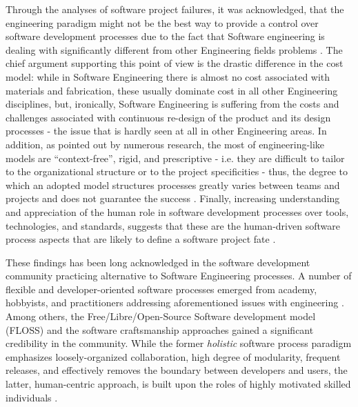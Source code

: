 Through the analyses of software project failures, it was acknowledged, that the engineering 
paradigm might not be the best way to provide a control over software development processes 
due to the fact that Software engineering is dealing with significantly different from other Engineering 
fields problems \cite{citeulike:3729379} \cite{citeulike:5203446} \cite{citeulike:2207657} .
The chief argument supporting this point of view is the drastic difference in the cost model:
while in Software Engineering there is almost no cost associated with materials and 
fabrication, these usually dominate cost in all other Engineering disciplines, but, 
ironically, Software Engineering is suffering from the costs and challenges associated with 
continuous re-design of the product and its design processes - the issue that is 
hardly seen at all in other Engineering areas. 
In addition, as pointed out by numerous research,  the most of engineering-like models are 
``context-free'', rigid, and prescriptive - i.e. they are difficult to tailor to the organizational 
structure or to the project specificities  - thus, the degree to which an adopted model structures 
processes greatly varies between teams and projects and does not guarantee the 
success \cite{sacchi_2001}.
Finally, increasing understanding and appreciation of the human role in software development 
processes over tools, technologies, and standards, suggests that these are the human-driven 
software process aspects that are likely to define a software project fate 
\cite{citeulike:6580825} \cite{citeulike:149387} \cite{1605185}
 \cite{citeulike:113403} \cite{citeulike:12743107}. 

These findings has been long acknowledged in the software development community practicing 
alternative to Software Engineering processes. 
A number of flexible and developer-oriented software processes emerged from academy,
hobbyists, and practitioners addressing aforementioned issues with engineering \cite{citeulike:3729379}. 
Among others, the Free/Libre/Open-Source Software development model (FLOSS) and the 
software craftsmanship  approaches gained a significant credibility in the community. 
While the former \textit{holistic} software process paradigm emphasizes loosely-organized 
collaboration, high degree of modularity, frequent releases, and effectively removes the boundary 
between developers and users, the latter, human-centric approach, is built upon the roles of highly 
motivated skilled individuals \cite{citeulike:262020} \cite{citeulike:2759198}. 

